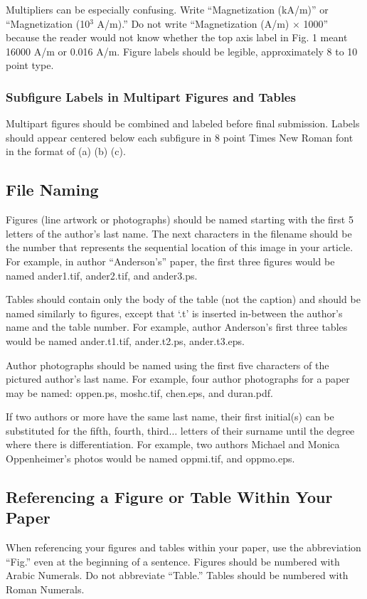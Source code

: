 \documentclass{ieeeaccess}
\begin{document}
Multipliers can be especially confusing. Write ``Magnetization (kA/m)'' or
``Magnetization (10$^{3}$ A/m).'' Do not write ``Magnetization
(A/m)$\,\times\,$1000'' because the reader would not know whether the top
axis label in Fig. 1 meant 16000 A/m or 0.016 A/m. Figure labels should be
legible, approximately 8 to 10 point type.

\subsubsection{Subfigure Labels in Multipart Figures and Tables}
Multipart figures should be combined and labeled before final submission.
Labels should appear centered below each subfigure in 8 point Times New
Roman font in the format of (a) (b) (c).

\subsection{File Naming}
Figures (line artwork or photographs) should be named starting with the
first 5 letters of the author's last name. The next characters in the
filename should be the number that represents the sequential
location of this image in your article. For example, in author
``Anderson's'' paper, the first three figures would be named ander1.tif,
ander2.tif, and ander3.ps.

Tables should contain only the body of the table (not the caption) and
should be named similarly to figures, except that `.t' is inserted
in-between the author's name and the table number. For example, author
Anderson's first three tables would be named ander.t1.tif, ander.t2.ps,
ander.t3.eps.

Author photographs should be named using the first five characters of the
pictured author's last name. For example, four author photographs for a
paper may be named: oppen.ps, moshc.tif, chen.eps, and duran.pdf.

If two authors or more have the same last name, their first initial(s) can
be substituted for the fifth, fourth, third$\ldots$ letters of their surname
until the degree where there is differentiation. For example, two authors
Michael and Monica Oppenheimer's photos would be named oppmi.tif, and
oppmo.eps.

\subsection{Referencing a Figure or Table Within Your Paper}
When referencing your figures and tables within your paper, use the
abbreviation ``Fig.'' even at the beginning of a sentence. Figures should be numbered with Arabic Numerals.
Do not abbreviate ``Table.'' Tables should be numbered with Roman Numerals.
\end{document}
